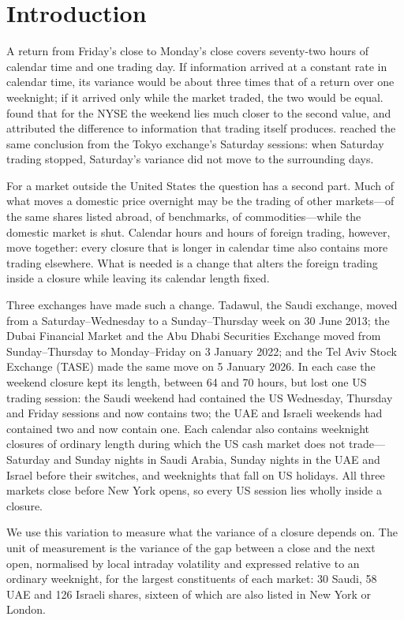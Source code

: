 \section{Introduction}

A return from Friday's close to Monday's close covers seventy-two hours of calendar time and one trading day. If information arrived at a constant rate in calendar time, its variance would be about three times that of a return over one weeknight; if it arrived only while the market traded, the two would be equal. \citet{FrenchRoll1986} found that for the NYSE the weekend lies much closer to the second value, and attributed the difference to information that trading itself produces. \citet{Barclay1990} reached the same conclusion from the Tokyo exchange's Saturday sessions: when Saturday trading stopped, Saturday's variance did not move to the surrounding days.

For a market outside the United States the question has a second part. Much of what moves a domestic price overnight may be the trading of other markets---of the same shares listed abroad, of benchmarks, of commodities---while the domestic market is shut. Calendar hours and hours of foreign trading, however, move together: every closure that is longer in calendar time also contains more trading elsewhere. What is needed is a change that alters the foreign trading inside a closure while leaving its calendar length fixed.

Three exchanges have made such a change. Tadawul, the Saudi exchange, moved from a Saturday--Wednesday to a Sunday--Thursday week on 30 June 2013; the Dubai Financial Market and the Abu Dhabi Securities Exchange moved from Sunday--Thursday to Monday--Friday on 3 January 2022; and the Tel Aviv Stock Exchange (TASE) made the same move on 5 January 2026. In each case the weekend closure kept its length, between 64 and 70 hours, but lost one US trading session: the Saudi weekend had contained the US Wednesday, Thursday and Friday sessions and now contains two; the UAE and Israeli weekends had contained two and now contain one. Each calendar also contains weeknight closures of ordinary length during which the US cash market does not trade---Saturday and Sunday nights in Saudi Arabia, Sunday nights in the UAE and Israel before their switches, and weeknights that fall on US holidays. All three markets close before New York opens, so every US session lies wholly inside a closure.

We use this variation to measure what the variance of a closure depends on. The unit of measurement is the variance of the gap between a close and the next open, normalised by local intraday volatility and expressed relative to an ordinary weeknight, for the largest constituents of each market: 30 Saudi, 58 UAE and 126 Israeli shares, sixteen of which are also listed in New York or London.

